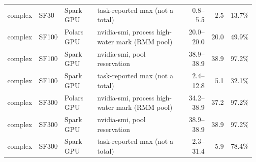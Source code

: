 \begin{tabular}{llllrrl}
complex & SF30 & Spark GPU & task-reported max (not a total) & 0.8--5.5 & 2.5 & 13.7\% \\
complex & SF100 & Polars GPU & nvidia-smi, process high-water mark (RMM pool) & 20.0--20.0 & 20.0 & 49.9\% \\
complex & SF100 & Spark GPU & nvidia-smi, pool reservation & 38.9--38.9 & 38.9 & 97.2\% \\
complex & SF100 & Spark GPU & task-reported max (not a total) & 2.4--12.8 & 5.1 & 32.1\% \\
complex & SF300 & Polars GPU & nvidia-smi, process high-water mark (RMM pool) & 34.2--38.9 & 37.2 & 97.2\% \\
complex & SF300 & Spark GPU & nvidia-smi, pool reservation & 38.9--38.9 & 38.9 & 97.2\% \\
complex & SF300 & Spark GPU & task-reported max (not a total) & 2.3--31.4 & 5.9 & 78.4\% \\
\bottomrule
\end{tabular}
